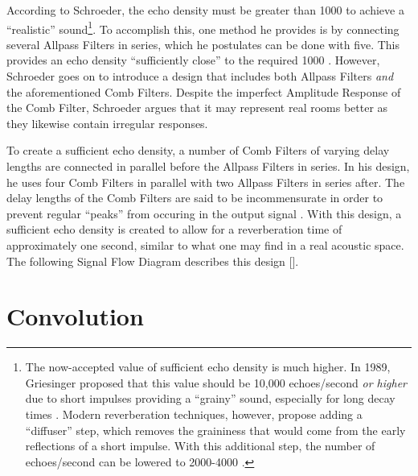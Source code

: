 According to Schroeder, the echo density must be greater than 1000 to achieve a ``realistic'' sound\footnote{The now-accepted value of sufficient echo density is much higher. In 1989, Griesinger proposed that this value should be 10,000 echoes/second \textit{or higher} due to short impulses providing a ``grainy'' sound, especially for long decay times \cite{griesinger1989practical}. Modern reverberation techniques, however, propose adding a ``diffuser'' step, which removes the graininess that would come from the early reflections of a short impulse. With this additional step, the number of echoes/second can be lowered to 2000-4000 \cite{FiftyYears}.}. To accomplish this, one method he provides is by connecting several Allpass Filters in series, which he postulates can be done with five. This provides an echo density ``sufficiently close'' to the required 1000 \cite{schroeder1961natural}. However, Schroeder goes on to introduce a design that includes both Allpass Filters \textit{and} the aforementioned Comb Filters. Despite the imperfect Amplitude Response of the Comb Filter, Schroeder argues that it may represent real rooms better as they likewise contain irregular responses.

To create a sufficient echo density, a number of Comb Filters of varying delay lengths are connected in parallel before the Allpass Filters in series. In his design, he uses four Comb Filters in parallel with two Allpass Filters in series after. The delay lengths of the Comb Filters are said to be incommensurate in order to prevent regular ``peaks'' from occuring in the output signal \cite{schroeder1961natural}. With this design, a sufficient echo density is created to allow for a reverberation time of approximately one second, similar to what one may find in a real acoustic space. The following Signal Flow Diagram describes this design [].

\section{Convolution}
